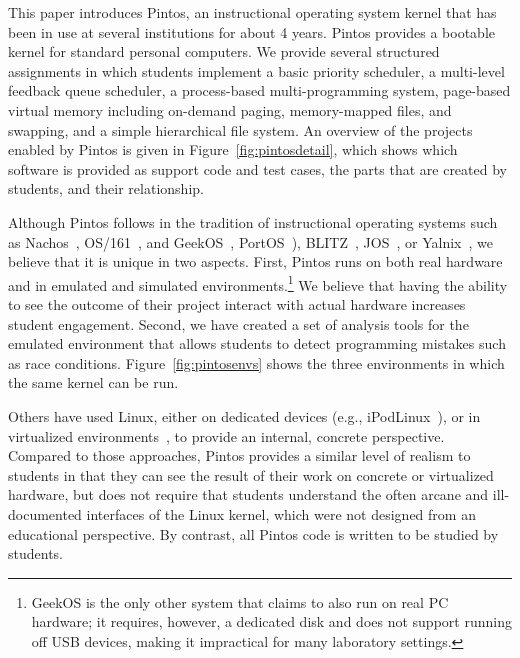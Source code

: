 This paper introduces Pintos, an instructional operating system kernel that 
has been in use at several institutions for about 4 years.  Pintos provides 
a bootable kernel for standard personal computers.  We provide several
structured assignments in which students implement a basic priority
scheduler, a multi-level feedback queue scheduler, a process-based 
multi-programming system, page-based virtual memory
including on-demand paging, memory-mapped files, and swapping, and a
simple hierarchical file system.  An overview of the projects enabled
by Pintos is given in Figure~\ref{fig:pintosdetail}, which shows which
software is provided as support code and test cases,
the parts that are created by students, and their relationship. 

Although Pintos follows in the tradition of instructional operating systems 
such as Nachos~\cite{Christopher1993Nachos}, OS/161~\cite{Holland2002New}, and
GeekOS~\cite{Hovemeyer2004Running}, 
PortOS~\cite{Atkin2002PortOS}),
BLITZ~\cite{PorterOverview},
JOS~\cite{1088822}, or Yalnix~\cite{1088822},
we believe that it is unique in two
aspects.  First, Pintos runs on both real hardware and in emulated and
simulated environments.\footnote{\small GeekOS is the only other system that claims to 
also run on real PC hardware; it requires, however, a dedicated disk and 
does not support running off USB devices, making it impractical for many 
laboratory settings.}  We believe that having the ability to see the outcome
of their project interact with actual hardware increases student engagement.
Second, we have created a set of analysis tools
for the emulated environment that allows students to detect programming
mistakes such as race conditions.  Figure~\ref{fig:pintosenvs} shows
the three environments in which the same kernel can be run.

Others have used Linux, either on dedicated devices (e.g., iPodLinux~\cite{1352199}),
or in virtualized environments~\cite{1008027,1352648,Nieh2005Experiences}, to provide
an internal, concrete perspective.  Compared to those approaches, Pintos provides
a similar level of realism to students in that they can see the result of their
work on concrete or virtualized hardware, but does not require that students 
understand the often arcane and ill-documented interfaces of the Linux kernel,
which were not designed from an educational perspective.  By contrast, all
Pintos code is written to be studied by students.


\pintosenvfigure{}

\pintosdetailfiguretwo{}



